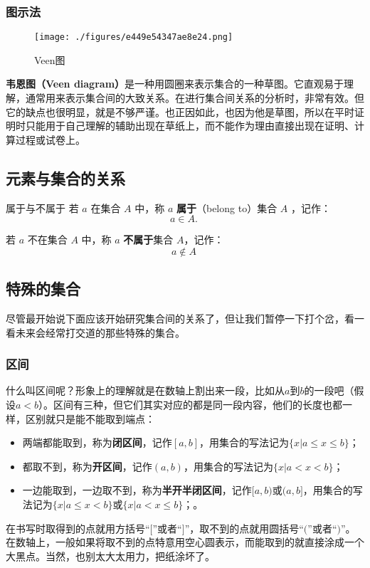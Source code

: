 \subsubsection{图示法}

\begin{figure}[ht]
\centering
\texttt{[image: ./figures/e449e54347ae8e24.png]}
\caption{Veen图} \label{fig_SufCnd_1}
\end{figure}

\textbf{韦恩图（Veen diagram）}是一种用圆圈来表示集合的一种草图。它直观易于理解，通常用来表示集合间的大致关系。在进行集合间关系的分析时，非常有效。但它的缺点也很明显，就是不够严谨。也正因如此，也因为他是草图，所以在平时证明时只能用于自己理解的辅助出现在草纸上，而不能作为理由直接出现在证明、计算过程或试卷上。

\subsection{元素与集合的关系}

\begin{definition}{属于与不属于}
若 $a$ 在集合 $A$ 中，称 $a$ \textbf{属于}（belong to）集合 $A$ ，记作：
\begin{equation}
a \in A.~
\end{equation}

若 $a$ 不在集合 $A$ 中，称 $a$ \textbf{不属于}集合 $A$，记作：
\begin{equation}
a\notin A~
\end{equation}
\end{definition}

\subsection{特殊的集合}

尽管最开始说下面应该开始研究集合间的关系了，但让我们暂停一下打个岔，看一看未来会经常打交道的那些特殊的集合。
\subsubsection{区间}

什么叫区间呢？形象上的理解就是在数轴上割出来一段，比如从$a$到$b$的一段吧（假设$a<b$）。区间有三种，但它们其实对应的都是同一段内容，他们的长度也都一样，区别就只是能不能取到端点：
\begin{itemize}
\item 两端都能取到，称为\textbf{闭区间}，记作$[a,b]$，用集合的写法记为$\{x|a\leq x\leq b\}$；
\item 都取不到，称为\textbf{开区间}，记作$(a,b)$，用集合的写法记为$\{x|a< x<b\}$；
\item 一边能取到，一边取不到，称为\textbf{半开半闭区间}，记作$[a,b)$或$(a,b]$，用集合的写法记为$\{x|a\leq x< b\}$或$\{x|a< x\leq b\}$；。
\end{itemize}
在书写时取得到的点就用方括号“$[$”或者“$]$”，取不到的点就用圆括号“$($”或者“$)$”。
在数轴上，一般如果将取不到的点特意用空心圆表示，而能取到的就直接涂成一个大黑点。当然，也别太大太用力，把纸涂坏了。
\addTODO{画个数轴的图，[-1,2)的区间}

